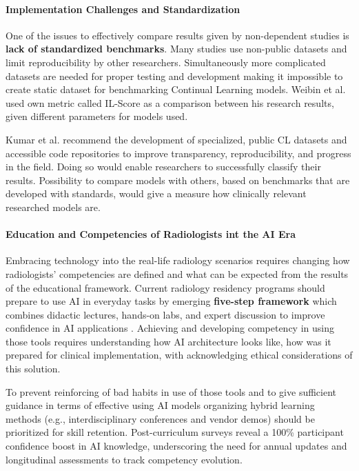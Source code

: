 \documentclass{IEEEcsmag}
\begin{document}
    \paragraph{Implementation Challenges and Standardization}
    One of the issues to effectively compare results given by non-dependent studies is \textbf{lack of standardized benchmarks}\cite{cite-18}.
    Many studies use non-public datasets and limit reproducibility by other researchers.
    Simultaneously more complicated datasets are needed for proper testing and development making it impossible to create static dataset for benchmarking Continual Learning models.
    Weibin et al. \cite{cite-19} used own metric called IL-Score as a comparison between his research results, given different parameters for models used.

    Kumar et al.\cite{cite-18} recommend the development of specialized, public CL datasets and accessible code repositories to improve transparency, reproducibility, and progress in the field.
    Doing so would enable researchers to successfully classify their results.
    Possibility to compare models with others, based on benchmarks that are developed with standards, would give a measure how clinically relevant researched models are.
    
    \paragraph{Education and Competencies of Radiologists int the AI Era}
    Embracing technology into the real-life radiology scenarios requires changing how radiologists' competencies are defined and what can be expected from the results of the educational framework.
    Current radiology residency programs should prepare to use AI in everyday tasks by emerging \textbf{five-step framework} which combines didactic lectures, hands-on labs, and expert discussion to improve confidence in AI applications \cite{cite-8}.
    Achieving and developing competency in using those tools requires understanding how AI architecture looks like, how was it prepared for clinical implementation, with acknowledging ethical considerations of this solution.
    
    To prevent reinforcing of bad habits in use of those tools and to give sufficient guidance in terms of effective using AI models organizing hybrid learning methods (e.g., interdisciplinary conferences and vendor demos) should be prioritized for skill retention\cite{cite-8}.
    Post-curriculum surveys reveal a 100\% participant confidence boost in AI knowledge, underscoring the need for annual updates and longitudinal assessments to track competency evolution\cite{cite-8}.
\end{document}

